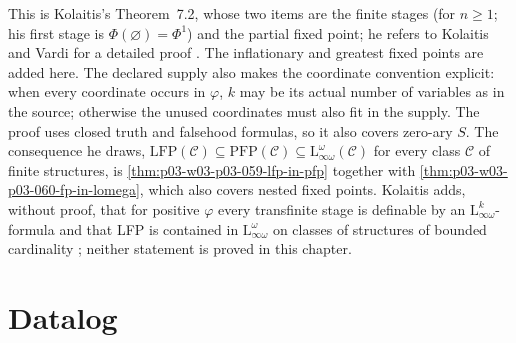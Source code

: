 This is Kolaitis's Theorem~7.2, whose two items are the finite stages (for
\(n\ge1\); his first stage is \(\Phi(\varnothing)=\Phi^1\)) and the partial
fixed point; he refers to Kolaitis and Vardi for a detailed proof
\cite[Thm.~7.2, p.~54]{Kolaitis2003ExpressivePowerNotes}. The
inflationary and greatest fixed points are added here. The declared supply
also makes the coordinate convention explicit: when every coordinate
occurs in \(\varphi\), \(k\) may be its actual number of variables as in
the source; otherwise the unused coordinates must also fit in the supply.
The proof uses closed truth and falsehood formulas, so it also covers
zero-ary \(S\). The consequence he
draws, \(\mathrm{LFP}(\mathcal C)\subseteq\mathrm{PFP}(\mathcal C)\subseteq\mathrm{L}^\omega_{\infty\omega}(\mathcal C)\)
for every class \(\mathcal C\) of finite structures, is
\cref{thm:p03-w03-p03-059-lfp-in-pfp} together with
\cref{thm:p03-w03-p03-060-fp-in-lomega}, which also covers nested fixed
points. Kolaitis adds, without proof, that for positive \(\varphi\) every
transfinite stage is definable by an \(\mathrm{L}^k_{\infty\omega}\)-formula
and that LFP is contained in \(\mathrm{L}^\omega_{\infty\omega}\) on classes
of structures of bounded cardinality \cite[p.~54]{Kolaitis2003ExpressivePowerNotes};
neither statement is proved in this chapter.

\section{Datalog}
\label{sec:p03-w03-p03-060-datalog}

